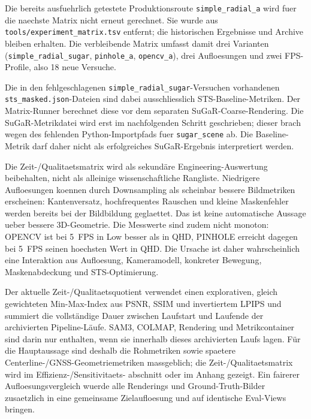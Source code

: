 \documentclass[12pt,a4paper]{article}
\begin{document}
Die bereits ausfuehrlich getestete Produktionsroute
\texttt{simple\_radial\_a} wird fuer die naechste Matrix nicht erneut
gerechnet. Sie wurde aus \texttt{tools/experiment\_matrix.tsv} entfernt; die
historischen Ergebnisse und Archive bleiben erhalten. Die verbleibende
Matrix umfasst damit drei Varianten
(\texttt{simple\_radial\_sugar}, \texttt{pinhole\_a}, \texttt{opencv\_a}),
drei Aufloesungen und zwei FPS-Profile, also 18 neue Versuche.

Die in den fehlgeschlagenen \texttt{simple\_radial\_sugar}-Versuchen
vorhandenen \texttt{sts\_masked.json}-Dateien sind dabei ausschliesslich
STS-Baseline-Metriken. Der Matrix-Runner berechnet diese vor dem separaten
SuGaR-Coarse-Rendering. Die SuGaR-Metrikdatei wird erst im nachfolgenden
Schritt geschrieben; dieser brach wegen des fehlenden Python-Importpfads fuer
\texttt{sugar\_scene} ab. Die Baseline-Metrik darf daher nicht als
erfolgreiches SuGaR-Ergebnis interpretiert werden.

Die Zeit-/Qualitaetsmatrix wird als sekundäre Engineering-Auswertung
beibehalten, nicht als alleinige wissenschaftliche Rangliste. Niedrigere
Aufloesungen koennen durch Downsampling als scheinbar bessere Bildmetriken
erscheinen: Kantenversatz, hochfrequentes Rauschen und kleine Maskenfehler
werden bereits bei der Bildbildung geglaettet. Das ist keine automatische
Aussage ueber bessere 3D-Geometrie. Die Messwerte sind zudem nicht monoton:
OPENCV ist bei 5~FPS in Low besser als in QHD, PINHOLE erreicht dagegen bei
5~FPS seinen hoechsten Wert in QHD. Die Ursache ist daher wahrscheinlich eine
Interaktion aus Aufloesung, Kameramodell, konkreter Bewegung, Maskenabdeckung
und STS-Optimierung.

Der aktuelle Zeit-/Qualitaetsquotient verwendet einen explorativen, gleich
gewichteten Min-Max-Index aus PSNR, SSIM und invertiertem LPIPS und summiert
die vollständige Dauer zwischen Laufstart und Laufende der archivierten
Pipeline-Läufe. SAM3, COLMAP, Rendering und Metrikcontainer sind darin nur
enthalten, wenn sie innerhalb dieses archivierten Laufs lagen. Für die Hauptaussage
sind deshalb die Rohmetriken sowie spaetere Centerline-/GNSS-Geometriemetriken
massgeblich; die Zeit-/Qualitaetsmatrix wird im Effizienz-/Sensitivitaets-
abschnitt oder im Anhang gezeigt. Ein fairerer Aufloesungsvergleich wuerde
alle Renderings und Ground-Truth-Bilder zusaetzlich in eine gemeinsame
Zielaufloesung und auf identische Eval-Views bringen.
\end{document}
